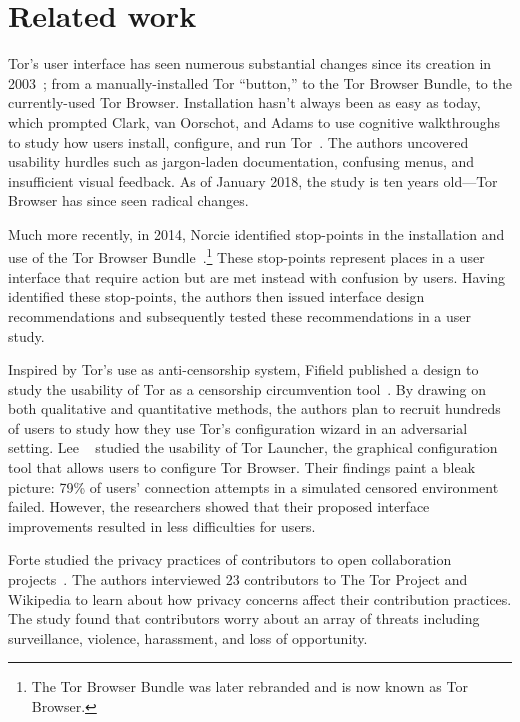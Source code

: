 \section{Related work}
\label{sec:related-work}

Tor's user interface has seen numerous substantial changes since its creation in
2003~\cite{Syverson2005a}; from a manually-installed Tor ``button,'' to the Tor
Browser Bundle, to the currently-used Tor Browser.  Installation hasn't always
been as easy as today, which prompted Clark, van Oorschot, and Adams to use
cognitive walkthroughs to study how users install, configure, and run
Tor~\cite{Clark2007a}.  The authors uncovered usability hurdles such as
jargon-laden documentation, confusing menus, and insufficient visual feedback.
As of January 2018, the study is ten years old---Tor Browser has since seen
radical changes.

Much more recently, in 2014, Norcie \ea identified stop-points in the
installation and use of the Tor Browser Bundle~\cite{Norcie2014a}.\footnote{The
Tor Browser Bundle was later rebranded and is now known as Tor Browser.}  These
stop-points represent places in a user interface that require action but are met
instead with confusion by users.  Having identified these stop-points, the
authors then issued interface design recommendations and subsequently tested
these recommendations in a user study.

Inspired by Tor's use as anti-censorship system, Fifield \ea published a design
to study the usability of Tor as a censorship circumvention
tool~\cite{Fifield2015a}.  By drawing on both qualitative and quantitative
methods, the authors plan to recruit hundreds of users to study how they use
Tor's configuration wizard in an adversarial setting.  Lee \ea~\cite{Lee2017a}
studied the usability of Tor Launcher, the graphical configuration tool that
allows users to configure Tor Browser.  Their findings paint a bleak picture:
79\% of users' connection attempts in a simulated censored environment failed.
However, the researchers showed that their proposed interface improvements
resulted in less difficulties for users.

Forte \ea studied the privacy practices of contributors to open collaboration
projects~\cite{Forte2017a}.  The authors interviewed 23 contributors to The Tor
Project and Wikipedia to learn about how privacy concerns affect their
contribution practices.  The study found that contributors worry about an array
of threats including surveillance, violence, harassment, and loss of
opportunity.

